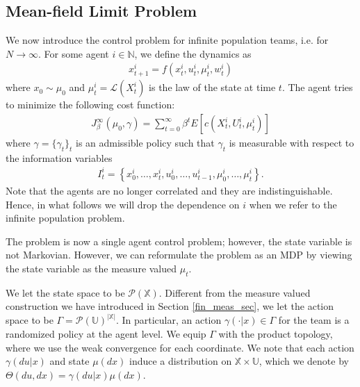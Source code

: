 \documentclass[twoside,11pt]{article}
\def\P{{\mathcal P}}
\begin{document}
\subsection{Mean-field Limit Problem}\label{limit_problem}
We now introduce the control problem for infinite population teams, i.e. for $N\to\infty$. For some agent $i\in \mathds{N}$, we define the dynamics as
\begin{align*}
x^i_{t+1}=f(x_t^i,u_t^i, \mu_t^i,w_t^i)
\end{align*}
where $x_0\sim\mu_0$ and $\mu_t^i=\mathcal{L}(X_t^i)$ is the law of the state at time $t$. The agent tries to minimize the following cost function:
\begin{align*}
J_\beta^{\infty}(\mu_0,\gamma)=\sum_{t=0}^\infty \beta^t E\left[c(X_t^i,U_t^i,\mu_t^i) \right]
\end{align*}
where $\gamma=\{\gamma_t\}_t$ is an admissible policy such that $\gamma_t$ is measurable with respect to the information variables 
\begin{align*}
I_t^i=\left\{ x_0^i,\dots,x_t^i,u_0^i,\dots,u_{t-1}^i,\mu_0^i,\dots,\mu_t^i  \right\}.
\end{align*}
Note that the agents are no longer correlated and they are indistinguishable. Hence, in what follows we will drop the dependence on $i$ when we refer to the infinite population problem. 

The problem is now a single agent control problem; however, the state variable is not Markovian. However, we can reformulate the problem as an MDP by viewing the state variable as the measure valued $\mu_t$. 

We let the state space to be $\P(\mathds{X})$. Different from the measure valued construction we have introduced in Section \ref{fin_meas_sec}, we let the action space to be $\Gamma = \P(\mathds{U})^{|\mathds{X}|}$. In particular, an action $\gamma(\cdot|x)\in\Gamma$ for the team is a randomized policy at the agent level. We equip $\Gamma$ with the product topology, where we use the weak convergence for each coordinate.  We note that each action $\gamma(du|x)$ and state $\mu(dx)$ induce a distribution on $\mathds{X}\times\mathds{U}$, which we denote by $\Theta(du,dx)=\gamma(du|x)\mu(dx)$.
 
\end{document}

